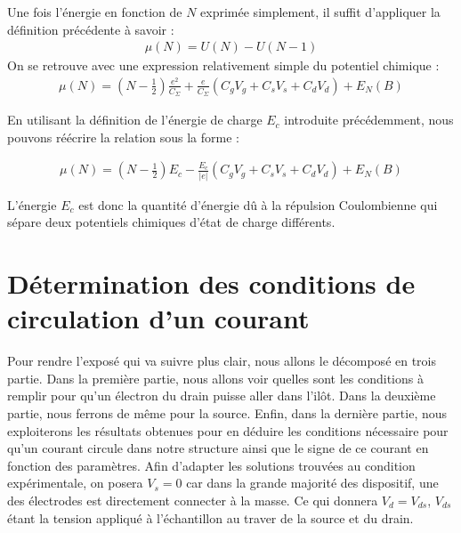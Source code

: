 Une fois l'énergie en fonction de $N$ exprimée simplement, il suffit d'appliquer la définition précédente à savoir :
\begin{eqnarray}
\mu(N) = U(N) - U(N-1) \nonumber
\end{eqnarray}
On se retrouve avec une expression relativement simple du potentiel chimique :
\begin{eqnarray}
\mu(N) = (N-\frac{1}{2})\frac{e^2}{C_{\Sigma}}
+ 
\frac{e}{C_{\Sigma}}(C_gV_g + C_sV_s + C_dV_d)
+
E_N(B)
\end{eqnarray}

En utilisant la définition de l'énergie de charge $E_c$ introduite précédemment, nous pouvons réécrire la relation sous la forme :

\begin{eqnarray}
\mu(N) = (N-\frac{1}{2})E_c
- 
\frac{E_c}{|e|}(C_gV_g + C_sV_s + C_dV_d)
+
E_N(B)
\label{pot_chim}
\end{eqnarray}

L'énergie $E_c$ est donc la quantité d'énergie d\^u à la répulsion Coulombienne qui sépare deux potentiels chimiques d'état de charge différents.


\section{Détermination des conditions de circulation d'un courant}
Pour rendre l'exposé qui va suivre plus clair, nous allons le décomposé en trois partie. Dans la première partie, nous allons voir quelles sont les conditions à remplir pour qu'un électron du drain puisse aller dans l'il\^ot. Dans la deuxième partie, nous ferrons de m\^eme pour la source. Enfin, dans la dernière partie, nous exploiterons les résultats obtenues pour en déduire les conditions nécessaire pour qu'un courant circule dans notre structure ainsi que le signe de ce courant en fonction des paramètres. Afin d'adapter les solutions trouvées au condition expérimentale, on posera $V_s = 0$ car dans la grande majorité des dispositif, une des électrodes est directement connecter à la masse. Ce qui donnera $V_d=V_{ds}$, $V_{ds}$ étant la tension appliqué à l'échantillon au traver de la source et du drain.

